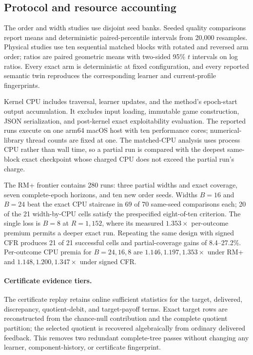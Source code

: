 \subsection{Protocol and resource accounting}
\label{app:claim-timing}

The order and width studies use disjoint seed banks.  Seeded quality
comparisons report means and deterministic paired-percentile intervals from
20,000 resamples.  Physical studies use ten sequential matched blocks with
rotated and reversed arm order; ratios are paired geometric means with
two-sided 95\% $t$ intervals on log ratios.  Every exact arm is deterministic
at fixed configuration, and every reported semantic twin reproduces the
corresponding learner and current-profile fingerprints.

Kernel CPU includes traversal, learner updates, and the method's epoch-start
output accumulation.  It excludes input loading, immutable game construction,
JSON serialization, and post-kernel exact exploitability evaluation.  The
reported runs execute on one arm64 macOS host with ten performance cores;
numerical-library thread counts are fixed at one.  The matched-CPU analysis
uses process CPU rather than wall time, so a partial run is compared with the
deepest same-block exact checkpoint whose charged CPU does not exceed the
partial run's charge.

The RM+ frontier contains 280 runs: three partial widths and exact coverage,
seven complete-epoch horizons, and ten new order seeds.  Widths $B=16$ and
$B=24$ beat the exact CPU staircase in 69 of 70 same-seed comparisons each;
20 of the 21 width-by-CPU cells satisfy the prespecified eight-of-ten
criterion.
The single loss is $B=8$ at $R=1{,}152$, where its measured
$1.353\times$ per-outcome premium permits a deeper exact run.  Repeating the
same design with signed CFR produces 21 of 21 successful cells and
partial-coverage gains of 8.4--27.2\%.  Per-outcome CPU premia for
$B=24,16,8$ are $1.146,1.197,1.353\times$ under RM+ and
$1.148,1.200,1.347\times$ under signed CFR.

\paragraph{Certificate evidence tiers.}
The certificate replay retains online sufficient statistics for the target,
delivered, discrepancy, quotient-debit, and target-payoff terms.  Exact target
rows are reconstructed from the chance-null contribution and the complete
quotient partition; the selected quotient is recovered algebraically from
ordinary delivered feedback.  This removes two redundant complete-tree
passes without changing any learner, component-history, or certificate
fingerprint.

